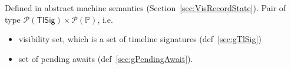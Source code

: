 
Defined in abstract machine semantics (Section~\ref{sec:VisRecordState}).
Pair of type $\mathcal{P}(\mathsf{TlSig}) \times \mathcal{P}(\mathbb{P})$, i.e.
\begin{itemize}
  \item visibility set, which is a set of timeline signatures (def~\ref{sec:gTlSig})
  \item set of pending awaits (def~\ref{sec:gPendingAwait}).
\end{itemize}

